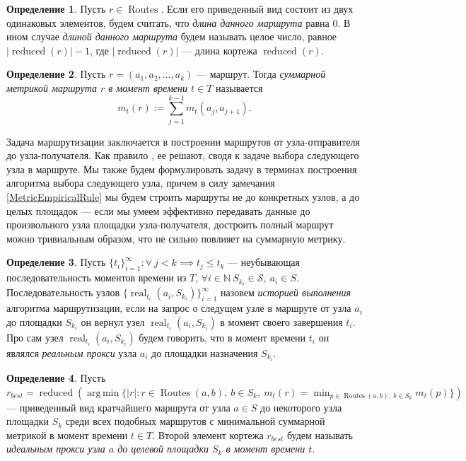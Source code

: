 \documentclass{article}
\theoremstyle{plain}
\theoremstyle{plain}
\theoremstyle{plain}
\theoremstyle{plain}
\theoremstyle{definition}
\newtheorem{definition}{Определение}[section]
\theoremstyle{remark}
\theoremstyle{plain}
\DeclareMathOperator*{\argmin}{arg\,min}
\DeclareMathOperator*{\real}{real}
\DeclareMathOperator*{\routes}{Routes}
\DeclareMathOperator*{\reduced}{reduced}
\begin{document}
\begin{definition}
    Пусть $r \in \routes$. Если его приведенный вид состоит из двух одинаковых элементов, будем считать, что \textit{длина данного маршрута} равна 0. В ином случае \textit{длиной данного маршрута} будем называть целое число, равное $|\reduced(r)| - 1$, где $|\reduced(r)|$ --- длина кортежа $\reduced(r)$.
\end{definition}

\begin{definition}
\label{RouteMetricDefinition}
    Пусть $r = (a_1, a_2, \ldots, a_k)$ --- маршрут. Тогда \textit{суммарной метрикой маршрута $r$ в момент времени $t \in T$} называется 
    \[
        m_t(r) := \displaystyle \sum_{j = 1}^{k - 1} m_t(a_{j}, a_{j + 1}).
    \]
\end{definition}

Задача маршрутизации заключается в построении маршрутов от узла-отправителя до узла-получателя. Как правило \cite{RFC2328, RFC2453}, ее решают, сводя к задаче выбора следующего узла в маршруте. Мы также будем формулировать задачу в терминах построения алгоритма выбора следующего узла, причем в силу замечания \ref{MetricEmpiricalRule} мы будем строить маршруты не до конкретных узлов, а до целых площадок --- если мы умеем эффективно передавать данные до произвольного узла площадки узла-получателя, достроить полный маршрут можно тривиальным образом, что не сильно повлияет на суммарную метрику.

\begin{definition}
    Пусть $\{t_i\}_{i = 1}^{\infty} \colon \forall\ j < k \implies t_j \leq t_k$ --- неубывающая последовательность моментов времени из $T$, $\forall i \in \mathbb{N}\ S_{k_i} \in \mathcal{S},\ a_i \in S$. Последовательность узлов $\{\real_{t_i}(a_i, S_{k_i})\}_{i = 1}^{\infty}$ назовем \textit{историей выполнения} алгоритма маршрутизации, если на запрос о следущем узле в маршруте от узла $a_i$ до площадки $S_{k_i}$ он вернул узел $\real_{t_i}(a_i, S_{k_i})$ в момент своего завершения $t_i$. Про сам узел $\real_{t_i}(a_i, S_{k_i})$ будем говорить, что в момент времени $t_i$ он являлся \textit{реальным прокси} узла $a_i$ до площадки назначения $S_{k_i}$.
\end{definition}

\begin{definition}
\label{IdealProxyDefinition}
    Пусть $r_{best} = \reduced( \argmin \{ |r| \colon r \in \routes(a,b),\ b \in S_k,\ m_t(r) = \displaystyle \min_{p \in \routes(a,b),\ b \in S_k} m_t(p) \} )$ --- приведенный вид кратчайшего маршрута от узла $a \in S$ до некоторого узла площадки $S_k$ среди всех подобных маршрутов с минимальной суммарной метрикой в момент времени $t \in T$. Второй элемент кортежа $r_{best}$ будем называть \textit{идеальным прокси узла $a$ до целевой площадки $S_k$ в момент времени $t$}.
\end{definition}
\end{document}
